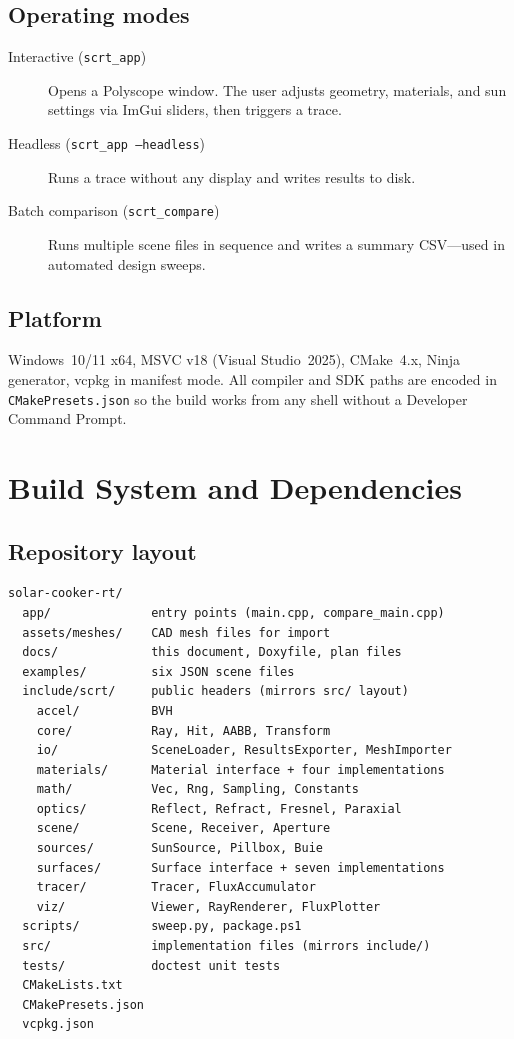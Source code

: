 \documentclass[12pt,a4paper]{report}
\begin{document}
\section{Operating modes}
\begin{description}
  \item[Interactive (\texttt{scrt\_app})] Opens a Polyscope window.  The user adjusts
    geometry, materials, and sun settings via ImGui sliders, then triggers a trace.
  \item[Headless (\texttt{scrt\_app --headless})] Runs a trace without any display and writes
    results to disk.
  \item[Batch comparison (\texttt{scrt\_compare})] Runs multiple scene files in sequence and
    writes a summary CSV—used in automated design sweeps.
\end{description}

\section{Platform}
Windows~10/11 x64, MSVC v18 (Visual Studio~2025), CMake~4.x, Ninja generator, vcpkg in
manifest mode.  All compiler and SDK paths are encoded in \texttt{CMakePresets.json} so the
build works from any shell without a Developer Command Prompt.

\chapter{Build System and Dependencies}

\section{Repository layout}

\begin{lstlisting}[language={}, basicstyle=\ttfamily\small, frame=none, backgroundcolor=\color{codebg}]
solar-cooker-rt/
  app/              entry points (main.cpp, compare_main.cpp)
  assets/meshes/    CAD mesh files for import
  docs/             this document, Doxyfile, plan files
  examples/         six JSON scene files
  include/scrt/     public headers (mirrors src/ layout)
    accel/          BVH
    core/           Ray, Hit, AABB, Transform
    io/             SceneLoader, ResultsExporter, MeshImporter
    materials/      Material interface + four implementations
    math/           Vec, Rng, Sampling, Constants
    optics/         Reflect, Refract, Fresnel, Paraxial
    scene/          Scene, Receiver, Aperture
    sources/        SunSource, Pillbox, Buie
    surfaces/       Surface interface + seven implementations
    tracer/         Tracer, FluxAccumulator
    viz/            Viewer, RayRenderer, FluxPlotter
  scripts/          sweep.py, package.ps1
  src/              implementation files (mirrors include/)
  tests/            doctest unit tests
  CMakeLists.txt
  CMakePresets.json
  vcpkg.json
\end{lstlisting}
\end{document}
